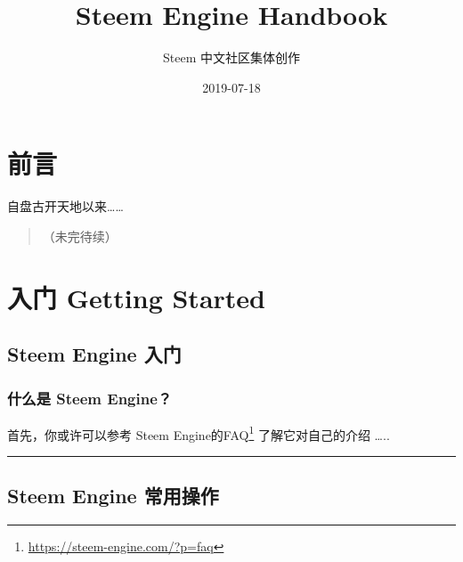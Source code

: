 \documentclass[]{ctexbook}
\title{Steem Engine Handbook}
\author{Steem 中文社区集体创作}
\date{2019-07-18}
\renewcommand{\href}[2]{#2\footnote{\url{#1}}}
\begin{document}

\begin{titlepage}

\end{titlepage}

\setlength{\abovedisplayskip}{-5pt}
\setlength{\abovedisplayshortskip}{-5pt}

{
\setcounter{tocdepth}{1}
\tableofcontents
}


\hypertarget{index}{%
\chapter*{前言}\label{index}}

自盘古开天地以来\ldots{}\ldots{}

\begin{quote}
（未完待续）
\end{quote}

\mainmatter

\hypertarget{start}{%
\chapter{入门 Getting Started}\label{start}}

\hypertarget{se-basics}{%
\section{Steem Engine 入门}\label{se-basics}}

\hypertarget{-steem-engine}{%
\subsection{什么是 Steem Engine？}\label{-steem-engine}}

首先，你或许可以参考 \href{https://steem-engine.com/?p=faq}{Steem Engine的FAQ} 了解它对自己的介绍 \ldots{}..

\begin{center}\rule{0.5\linewidth}{\linethickness}\end{center}

\hypertarget{se-operation}{%
\section{Steem Engine 常用操作}\label{se-operation}}
\end{document}
